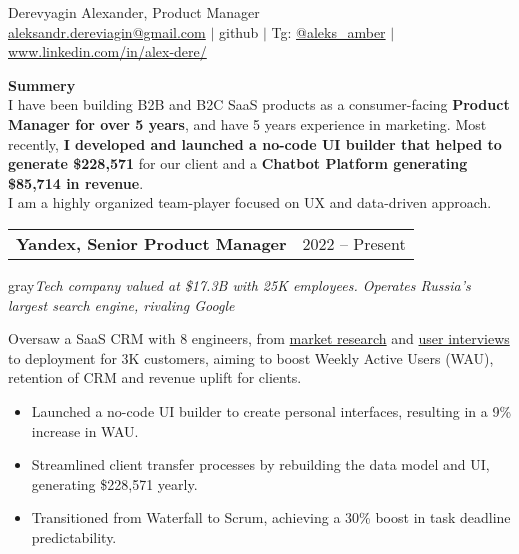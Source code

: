 \documentclass[letterpaper,11pt]{article}
\makeatletter
\newcommand{\resumeSubheading}[4]{
  \vspace{-1pt}\item
    \begin{tabular*}{\textwidth}[t]{l@{\extracolsep{\fill}}r}
      \textbf{#1} & {\small #2} %
    \end{tabular*}
}
\makeatother
\begin{document}

    {\Large Derevyagin Alexander, Product Manager} \\ \vspace{5pt}
    \href{mailto:aleksandr.dereviagin@gmail.com}{aleksandr.dereviagin@gmail.com} \hspace{1pt} $|$ 
    github \hspace{1pt} $|$ 
    Tg: \href{https://t.me/aleks_amber}{@aleks\_amber}  \hspace{1pt} $|$ 
    \href{https://www.linkedin.com/in/alex-dere/}{www.linkedin.com/in/alex-dere/}
    \\ \vspace{20pt}




  \textbf{Summery}\\
  I  have been building B2B and B2C SaaS products as a consumer-facing \textbf{Product Manager for over 5 years}, and have 5 years experience in marketing. Most recently, \textbf{I developed and launched a no-code UI builder that helped to generate \$228,571 }for our client and a \textbf{Chatbot Platform generating \$85,714 in revenue}.\\
 I am a highly organized team-player focused on UX and data-driven approach.
\vspace{20pt}

\resumeSubheading
      {Yandex, Senior Product Manager}{2022 -- Present}  
\\
      
      \textcolor{gray}{\textit{Tech company valued at \$17.3B with 25K employees. Operates Russia's largest search engine, rivaling Google}}

Oversaw a SaaS CRM with 8 engineers, from \href{https://miro.com/app/board/uXjVK_QBCw0=/?moveToWidget=3458764591348909874&cot=14}{market research} and \href{https://miro.com/app/board/uXjVK_QBCw0=/?moveToWidget=3458764592116344712&cot=14}{user interviews} to deployment for 3K customers, aiming to boost Weekly Active Users (WAU), retention of CRM and revenue uplift for clients.
\begin{itemize}[itemsep=-5pt]
    \item Launched a no-code UI builder to create personal interfaces, resulting in a 9\% increase in WAU.
    \item Streamlined client transfer processes by rebuilding the data model and UI, generating \$228,571 yearly.
    \item Transitioned from Waterfall to Scrum, achieving a 30\% boost in task deadline predictability.
\end{itemize}
\vspace{20pt}
\end{document}
